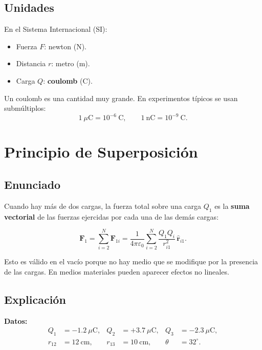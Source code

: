 \documentclass[12pt,a4paper]{article}
\begin{document}
\subsection{Unidades}

En el Sistema Internacional (SI):
\begin{itemize}[nosep]
  \item Fuerza $F$: newton (N).
  \item Distancia $r$: metro (m).
  \item Carga $Q$: \textbf{coulomb} (C).
\end{itemize}

Un coulomb es una cantidad muy grande. En experimentos típicos se usan submúltiplos:
\[
1\ \mu\text{C} = 10^{-6}\ \text{C},\qquad
1\ \text{nC} = 10^{-9}\ \text{C}.
\]

\section{Principio de Superposición}

\subsection{Enunciado}

Cuando hay más de dos cargas, la fuerza total sobre una carga $Q_1$ es la \textbf{suma vectorial} de las fuerzas ejercidas por cada una de las demás cargas:

\begin{keybox}
\[
\mathbf{F}_1 = \sum_{i=2}^{N} \mathbf{F}_{1i}
           = \frac{1}{4\pi\varepsilon_0} \sum_{i=2}^{N} \frac{Q_1 Q_i}{r_{i1}^2}\,\hat{\mathbf{r}}_{i1}.
\]
\end{keybox}

\noindent Esto es válido en el vacío porque no hay medio que se modifique por la presencia de las cargas. En medios materiales pueden aparecer efectos no lineales.

\subsection{Explicación}

\textbf{Datos:}
\begin{align*}
Q_1 &= -1.2\ \mu\text{C}, &
Q_2 &= +3.7\ \mu\text{C}, &
Q_3 &= -2.3\ \mu\text{C}, \\
r_{12} &= 12\ \text{cm}, &
r_{13} &= 10\ \text{cm}, &
\theta &= 32^\circ.
\end{align*}
\end{document}

